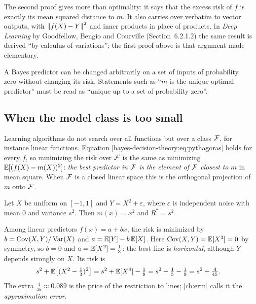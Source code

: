 \begin{notechapter}
The second proof gives more than optimality: it says that the excess risk of
$f$ is exactly its mean squared distance to $m$. It also carries over verbatim
to vector outputs, with $\left\|f(X) - Y\right\|^2$ and inner products in place of
products. In \emph{Deep Learning} by Goodfellow, Bengio and Courville
(Section~6.2.1.2) the same result is derived ``by calculus of variations'';
the first proof above is that argument made elementary.

\begin{pitfall}
A Bayes predictor can be changed arbitrarily on a set of inputs of probability
zero without changing its risk. Statements such as ``$m$ is the unique
optimal predictor'' must be read as ``unique up to a set of probability
zero''.
\end{pitfall}

\subsection{When the model class is too small}\label{bayes-decision-theory:sec:projection}

Learning algorithms do not search over all functions but over a class $\mathcal{F}$,
for instance linear functions. Equation \eqref{bayes-decision-theory:eq:pythagoras}
holds for every $f$, so minimizing the risk over $\mathcal{F}$ is the same as
minimizing $\mathbb{E}[(f(X)-m(X))^2]$: \emph{the best predictor in $\mathcal{F}$ is the
element of $\mathcal{F}$ closest to $m$} in mean square. When $\mathcal{F}$ is a closed linear
space this is the orthogonal projection of $m$ onto $\mathcal{F}$.

\begin{example}\label{bayes-decision-theory:ex:parabola}
Let $X$ be uniform on $[-1,1]$ and $Y = X^2 + \varepsilon$, where
$\varepsilon$ is independent noise with mean $0$ and variance $s^2$. Then
$m(x) = x^2$ and $R^* = s^2$.

Among linear predictors $f(x) = a + bx$, the risk is minimized by
$b = \operatorname{Cov}(X, Y)/\operatorname{Var}(X)$ and $a = \mathbb{E}[Y] - b\,\mathbb{E}[X]$. Here
$\operatorname{Cov}(X,Y) = \mathbb{E}[X^3] = 0$ by symmetry, so $b = 0$ and
$a = \mathbb{E}[X^2] = \frac13$: the best line is \emph{horizontal}, although $Y$
depends strongly on $X$. Its risk is
\[
  s^2 + \mathbb{E}\bigl[(X^2 - \tfrac13)^2\bigr] = s^2 + \mathbb{E}[X^4] - \tfrac19
  = s^2 + \tfrac15 - \tfrac19 = s^2 + \tfrac{4}{45}.
\]
The extra $\frac4{45} \approx 0.089$ is the price of the restriction to
lines; \cref{ch:erm} calls it the \emph{approximation error}.
\end{example}


\end{notechapter}
